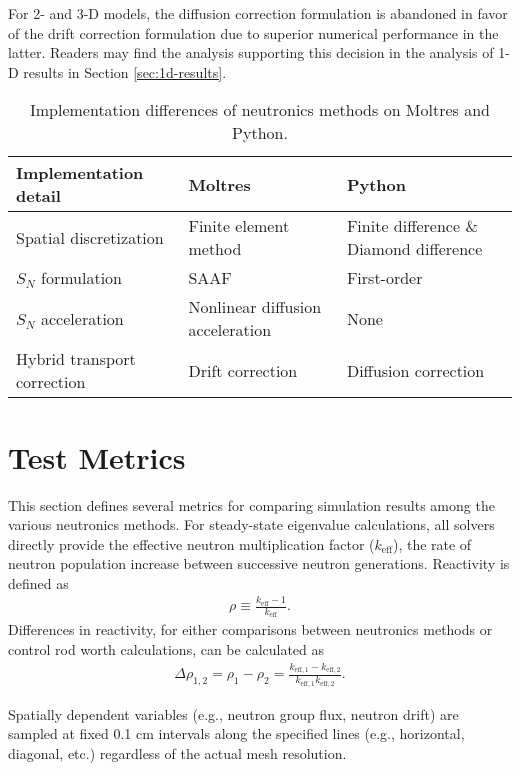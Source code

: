 For 2- and 3-D models, the diffusion correction formulation is abandoned in favor of the drift
correction formulation due to superior numerical performance in the latter. Readers may find the
analysis supporting this decision in the analysis of 1-D results in Section \ref{sec:1d-results}.

\begin{table}[htb!]
  \centering
  \footnotesize
  \caption{Implementation differences of neutronics methods on Moltres and Python.}
  \begin{tabular}{l l l}
    \toprule
    Implementation detail & Moltres & Python \\
    \midrule
    Spatial discretization & Finite element method & Finite difference \& Diamond difference \\
    $S_N$ formulation & SAAF & First-order \\
    $S_N$ acceleration & Nonlinear diffusion acceleration & None \\
    Hybrid transport correction & Drift correction & Diffusion correction \\
    \bottomrule
  \end{tabular}
  \label{table:nts-methods}
\end{table}

\section{Test Metrics} \label{sec:test-metrics}

This section defines several metrics for comparing simulation results among the various
neutronics methods.
For steady-state eigenvalue calculations, all solvers directly provide the effective neutron
multiplication factor ($k_\text{eff}$), the rate of neutron population increase between successive
neutron generations. Reactivity is defined as
%
\begin{gather}
  \rho \equiv \frac{k_\text{eff}-1}{k_\text{eff}}.
\end{gather}
%
Differences in reactivity, for either comparisons between neutronics methods or control rod worth
calculations, can be calculated as
%
\begin{gather}
  \Delta\rho_{1,2} = \rho_1 - \rho_2 =
  \frac{k_{\text{eff},1}-k_{\text{eff},2}}{k_{\text{eff},1}k_{\text{eff},2}}.
\end{gather}

Spatially dependent variables (e.g., neutron group flux, neutron drift) are sampled at fixed 0.1 cm
intervals along the specified lines (e.g., horizontal, diagonal, etc.) regardless of the actual
mesh resolution.

